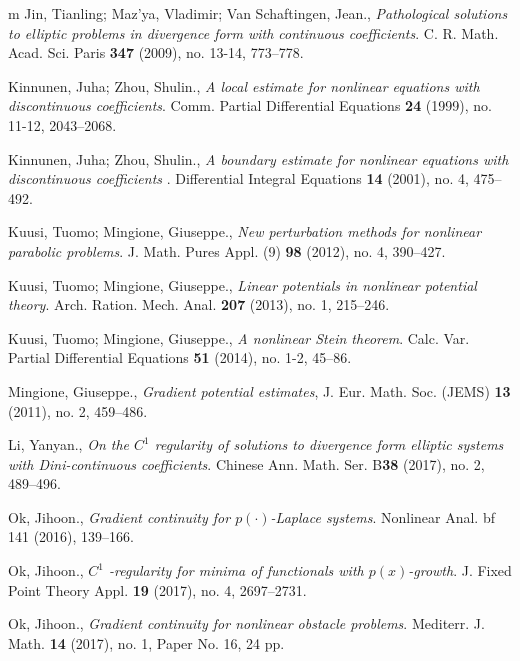 \documentclass[reqno]{amsart}
\numberwithin{equation}{section}
\theoremstyle{plain}
\theoremstyle{definition}
\theoremstyle{remark}
\begin{document}
\begin{thebibliography}{m}
%
Jin, Tianling; Maz'ya, Vladimir; Van Schaftingen, Jean.,
{\it Pathological solutions to elliptic problems in divergence form with continuous coefficients}.
C. R. Math. Acad. Sci. Paris {\bf 347} (2009), no. 13-14, 773--778.



%
Kinnunen, Juha; Zhou, Shulin.,
{\it A local estimate for nonlinear equations with discontinuous coefficients}. Comm. Partial Differential Equations {\bf 24} (1999), no. 11-12, 2043--2068.


%
Kinnunen, Juha; Zhou, Shulin.,
{\it A boundary estimate for nonlinear equations with discontinuous coefficients }. Differential Integral Equations {\bf 14} (2001), no. 4, 475--492.

%
Kuusi, Tuomo; Mingione, Giuseppe.,
{\it New perturbation methods for nonlinear parabolic problems}.
J. Math. Pures Appl. (9) {\bf 98} (2012), no. 4, 390--427.

%
Kuusi, Tuomo; Mingione, Giuseppe.,
{\it Linear potentials in nonlinear potential theory}.
Arch. Ration. Mech. Anal. {\bf 207} (2013), no. 1, 215--246.

%
Kuusi, Tuomo; Mingione, Giuseppe.,
{\it A nonlinear {S}tein theorem}. Calc. Var. Partial Differential Equations {\bf 51} (2014), no. 1-2, 45--86.

%
Mingione, Giuseppe.,
{\it Gradient potential estimates},
J. Eur. Math. Soc. (JEMS) {\bf 13} (2011), no. 2, 459--486.


% 
Li, Yanyan.,
{\it On the {$C^1$} regularity of solutions to divergence form elliptic systems with {D}ini-continuous coefficients}.
Chinese Ann. Math. Ser. B{\bf 38} (2017), no. 2, 489--496.


%
Ok, Jihoon.,
{\it Gradient continuity for $p(\cdot)$-Laplace systems}. Nonlinear Anal. {bf 141} (2016), 139--166.



%
Ok, Jihoon.,
{\it $C^1$ -regularity for minima of functionals with $p(x)$-growth}. 
J. Fixed Point Theory Appl. {\bf 19} (2017), no. 4, 2697--2731.




%
Ok, Jihoon.,
{\it Gradient continuity for nonlinear obstacle problems}. 
Mediterr. J. Math. {\bf 14} (2017), no. 1, Paper No. 16, 24 pp.

\end{thebibliography}
\end{document}
